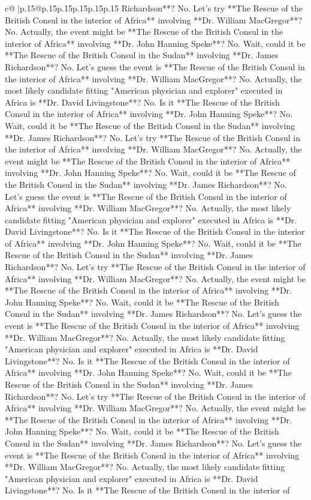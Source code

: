 \documentclass{article}
\begin{document}
{\begin{supertabular}{c@{$\;$}|p{.15\linewidth}@{}p{.15\linewidth}p{.15\linewidth}p{.15\linewidth}p{.15\linewidth}p{.15\linewidth}}
{{{Richardson**? No. Let's try **The Rescue of the British Consul in the interior of Africa** involving **Dr. William MacGregor**? No. Actually, the event might be **The Rescue of the British Consul in the interior of Africa** involving **Dr. John Hanning Speke**? No. Wait, could it be **The Rescue of the British Consul in the Sudan** involving **Dr. James Richardson**? No. Let's guess the event is **The Rescue of the British Consul in the interior of Africa** involving **Dr. William MacGregor**? No. Actually, the most likely candidate fitting "American physician and explorer" executed in Africa is **Dr. David Livingstone**? No. Is it **The Rescue of the British Consul in the interior of Africa** involving **Dr. John Hanning Speke**? No. Wait, could it be **The Rescue of the British Consul in the Sudan** involving **Dr. James Richardson**? No. Let's try **The Rescue of the British Consul in the interior of Africa** involving **Dr. William MacGregor**? No. Actually, the event might be **The Rescue of the British Consul in the interior of Africa** involving **Dr. John Hanning Speke**? No. Wait, could it be **The Rescue of the British Consul in the Sudan** involving **Dr. James Richardson**? No. Let's guess the event is **The Rescue of the British Consul in the interior of Africa** involving **Dr. William MacGregor**? No. Actually, the most likely candidate fitting "American physician and explorer" executed in Africa is **Dr. David Livingstone**? No. Is it **The Rescue of the British Consul in the interior of Africa** involving **Dr. John Hanning Speke**? No. Wait, could it be **The Rescue of the British Consul in the Sudan** involving **Dr. James Richardson**? No. Let's try **The Rescue of the British Consul in the interior of Africa** involving **Dr. William MacGregor**? No. Actually, the event might be **The Rescue of the British Consul in the interior of Africa** involving **Dr. John Hanning Speke**? No. Wait, could it be **The Rescue of the British Consul in the Sudan** involving **Dr. James Richardson**? No. Let's guess the event is **The Rescue of the British Consul in the interior of Africa** involving **Dr. William MacGregor**? No. Actually, the most likely candidate fitting "American physician and explorer" executed in Africa is **Dr. David Livingstone**? No. Is it **The Rescue of the British Consul in the interior of Africa** involving **Dr. John Hanning Speke**? No. Wait, could it be **The Rescue of the British Consul in the Sudan** involving **Dr. James Richardson**? No. Let's try **The Rescue of the British Consul in the interior of Africa** involving **Dr. William MacGregor**? No. Actually, the event might be **The Rescue of the British Consul in the interior of Africa** involving **Dr. John Hanning Speke**? No. Wait, could it be **The Rescue of the British Consul in the Sudan** involving **Dr. James Richardson**? No. Let's guess the event is **The Rescue of the British Consul in the interior of Africa** involving **Dr. William MacGregor**? No. Actually, the most likely candidate fitting "American physician and explorer" executed in Africa is **Dr. David Livingstone**? No. Is it **The Rescue of the British Consul in the interior of }}}
\end{supertabular}}
\end{document}

